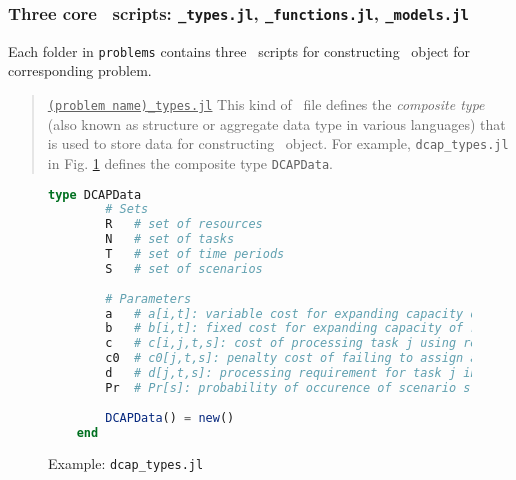 \subsubsection{Three core \julia\ scripts: \texttt{\_types.jl}, \texttt{\_functions.jl}, \texttt{\_models.jl}}
Each folder in \texttt{problems} contains three \julia\ scripts for constructing \jumpmodel\ object for corresponding problem.

\begin{quote}
\noindent\underline{\texttt{(problem name)\_types.jl}} This kind of \julia\ file defines the \textit{composite type} (also known as structure or aggregate data type in various languages) that is used to store data for constructing \jumpmodel\ object. For example, \texttt{dcap\_types.jl} in Fig. \ref{fig:dcap_types} defines the composite type \texttt{DCAPData}.
\end{quote}
\begin{figure}[H]
	\centering
	\begin{lstlisting}[frame=single,language=julia]
	type DCAPData
		# Sets
		R   # set of resources 
		N   # set of tasks 
		T   # set of time periods 
		S   # set of scenarios 
		
		# Parameters
		a   # a[i,t]: variable cost for expanding capacity of resource i at time t
		b   # b[i,t]: fixed cost for expanding capacity of resource i at time t
		c   # c[i,j,t,s]: cost of processing task j using resource i in period t under scenario s
		c0  # c0[j,t,s]: penalty cost of failing to assign a resource to task j under scenario s
		d   # d[j,t,s]: processing requirement for task j in period t under scenario s
		Pr  # Pr[s]: probability of occurence of scenario s
	
		DCAPData() = new()
	end
	\end{lstlisting}
	\caption{Example: \texttt{dcap\_types.jl}}\label{fig:dcap_types}
\end{figure}

